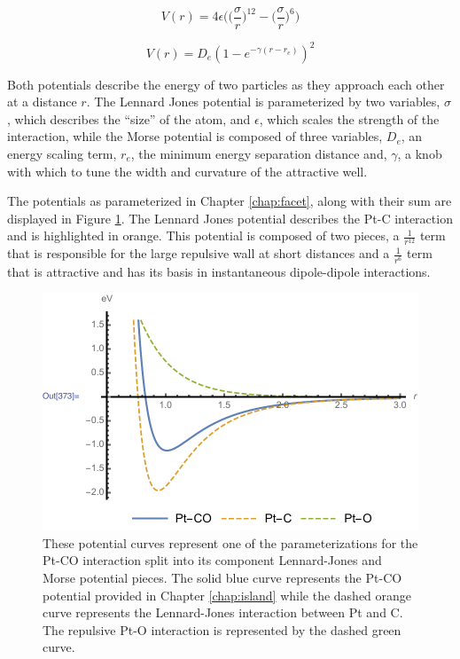 \begin{equation}
V(r) = 4\epsilon\bigg(\bigg(\frac{\sigma}{r}\bigg)^{12} - \bigg(\frac{\sigma}{r}\bigg)^6\bigg)
\label{eq:lj}
\end{equation}

\begin{equation}
V(r) = D_e(1-e^{-\gamma(r-r_e)})^2
\label{eq:mp}
\end{equation}


Both potentials describe the energy of two particles as they approach each
other at a distance $r$. The Lennard Jones potential is parameterized by two variables, $\sigma$,
which describes the ``size'' of the atom, and $\epsilon$, which scales the
strength of the interaction, while the Morse potential is composed of three
variables, $D_e$, an energy scaling term, $r_e$, the minimum energy separation
distance and, $\gamma$, a knob with which to tune the width and curvature of the attractive well.

The potentials as parameterized in Chapter \ref{chap:facet}, along with their
sum are displayed in Figure \ref{fig:potentials}. The Lennard Jones potential
describes the Pt-C interaction and is highlighted in orange. This potential is
composed of two pieces, a $\frac{1}{r^{12}}$ term that is responsible for the
large repulsive wall at short distances and a $\frac{1}{r^{6}}$ term that is
attractive and has its basis in instantaneous dipole-dipole interactions.


\begin{figure}
\centering
\includegraphics[width=\linewidth]{../figures/chap1/bindingEnergy.pdf}
\caption{These potential curves represent one of the parameterizations for the Pt-CO
interaction split into its component Lennard-Jones and Morse potential pieces.
The solid blue curve represents the Pt-CO potential provided in Chapter
\ref{chap:island} while the dashed orange curve represents the
Lennard-Jones interaction between Pt and C. The repulsive Pt-O interaction is
represented by the dashed green curve.}
\label{fig:potentials}
\end{figure}


